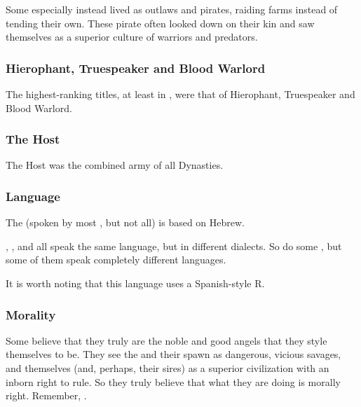 Some \resphain\dash especially \dash instead lived as outlaws and pirates, raiding farms instead of tending their own.
These pirate \resphain often looked down on their  kin and saw themselves as a superior culture of warriors and predators.





\subsubsection{Hierophant, Truespeaker and Blood Warlord}
The highest-ranking \resphan titles, at least in \Merkyrah, were that of Hierophant, Truespeaker and Blood Warlord. 





\subsubsection{The Host}
The Host was the combined army of all \resphan Dynasties.





\subsubsection{Language}
The  (spoken by most \resphain, but not all) is based on Hebrew. 

\Mystraacht, \CiriathSepher, \TiphredSerah{} and \Kezerad{} all speak the same language, but in different dialects. 
So do some \Baelzerach, but some of them speak completely different languages. 

It is worth noting that this language uses a Spanish-style  R. 





\subsubsection{Morality}
Some \resphain{} believe that they truly are the noble and good angels that they style themselves to be. They see the \dragons{} and their spawn as dangerous, vicious savages, and themselves (and, perhaps, their \SitraAchra sires) as a superior civilization with an inborn right to rule. So they truly believe that what they are doing is morally right. Remember, .

